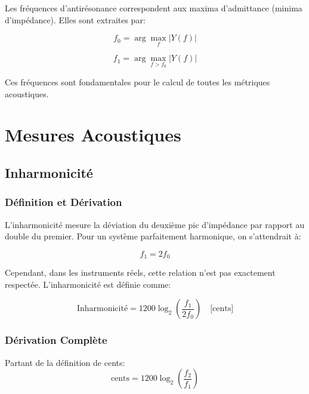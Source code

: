 \documentclass[12pt,a4paper,twocolumn]{article}
\newcommand{\admittance}{Y}
\newcommand{\freqzero}{f_0}
\newcommand{\freqone}{f_1}
\begin{document}
Les fréquences d'antirésonance correspondent aux maxima d'admittance (minima d'impédance). Elles sont extraites par:

\begin{equation}
\freqzero = \arg\max_f |\admittance(f)|
\label{eq:antiresonance_1}
\end{equation}

\begin{equation}
\freqone = \arg\max_{f > \freqzero} |\admittance(f)|
\label{eq:antiresonance_2}
\end{equation}

Ces fréquences sont fondamentales pour le calcul de toutes les métriques acoustiques.

\section{Mesures Acoustiques}

\subsection{Inharmonicité}

\subsubsection{Définition et Dérivation}

L'inharmonicité mesure la déviation du deuxième pic d'impédance par rapport au double du premier. Pour un système parfaitement harmonique, on s'attendrait à:

\begin{equation}
\freqone = 2\freqzero
\label{eq:harmonique_ideal}
\end{equation}

Cependant, dans les instruments réels, cette relation n'est pas exactement respectée. L'inharmonicité est définie comme:

\begin{equation}
\text{Inharmonicité} = 1200 \log_2\left(\frac{\freqone}{2\freqzero}\right) \quad \text{[cents]}
\label{eq:inharmonicite}
\end{equation}

\subsubsection{Dérivation Complète}

Partant de la définition de cents:
\begin{equation}
\text{cents} = 1200 \log_2\left(\frac{f_2}{f_1}\right)
\label{eq:cents_def}
\end{equation}
\end{document}

